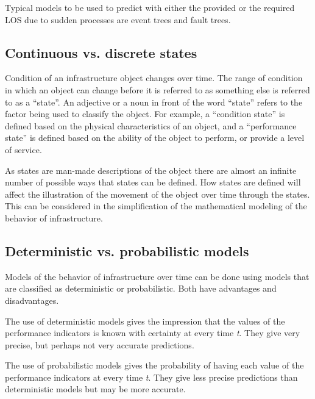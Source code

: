 Typical models to be used to predict with either the provided or the required LOS due to sudden processes are event trees and fault trees.
%
\subsection{Continuous vs. discrete states}
%
Condition of an infrastructure object changes over time. The range of condition in which an object can change before it is referred to as something else is referred to as a ``state''. An adjective or a noun in front of the word ``state'' refers to the factor being used to classify the object. For example, a ``condition state'' is defined based on the physical characteristics of an object, and a ``performance state'' is defined based on the ability of the object to perform, or provide a level of service. 

As states are man-made descriptions of the object there are almost an infinite number of possible ways that states can be defined. How states are defined will affect the illustration of the movement of the object over time through the states. This can be considered in the simplification of the mathematical modeling of the behavior of infrastructure. 
%
\subsection{Deterministic vs. probabilistic models}
Models of the behavior of infrastructure over time can be done using models that are classified as deterministic or probabilistic. Both have advantages and disadvantages.

The use of deterministic models gives the impression that the values of the performance indicators is known with certainty at every time \textit{t}. They give very precise, but perhaps not very accurate predictions.

The use of probabilistic models gives the probability of having each value of the performance indicators at every time \textit{t}. They give less precise predictions than deterministic models but may be more accurate. 
